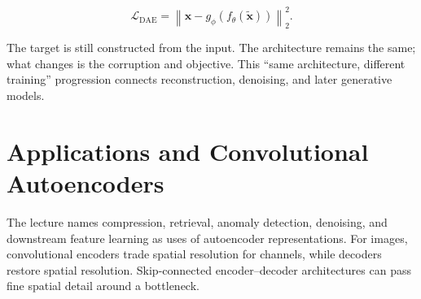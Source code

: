 \documentclass{article}
\begin{document}
\[
\mathcal{L}_{\mathrm{DAE}}
=\left\|\mathbf{x}-g_{\phi}\!\left(f_{\theta}(\tilde{\mathbf{x}})\right)\right\|_2^2.
\]

The target is still constructed from the input. The architecture remains the same;
what changes is the corruption and objective. This ``same architecture, different
training'' progression connects reconstruction, denoising, and later generative models.

\section{Applications and Convolutional Autoencoders}

The lecture names compression, retrieval, anomaly detection, denoising, and downstream
feature learning as uses of autoencoder representations. For images, convolutional
encoders trade spatial resolution for channels, while decoders restore spatial
resolution. Skip-connected encoder--decoder architectures can pass fine spatial detail
around a bottleneck.

\end{document}
